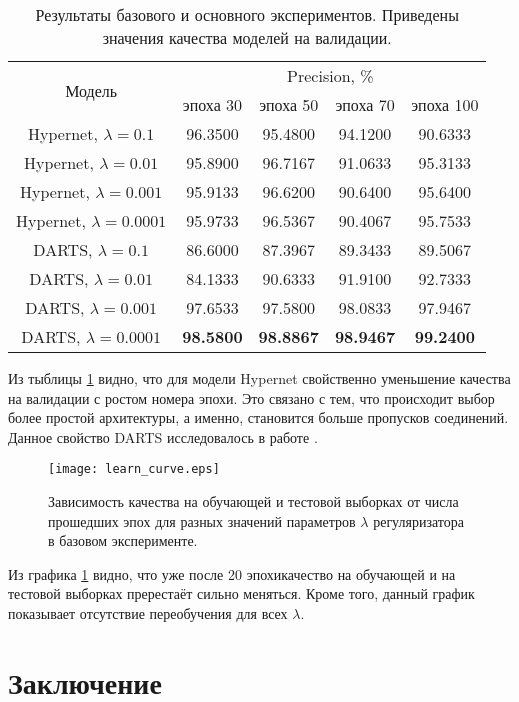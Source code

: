 \documentclass[12pt, twoside]{article}
\begin{document}
\begin{table}[H]
\centering
	\begin{tabular}{ |c|c|c|c|c| }
	\hline
	 \multirow{2}{*}{Модель} & \multicolumn{4}{c|}{Precision, \%} \\ \cline{2-5}
	 		& эпоха 30 & эпоха 50 & эпоха 70 & эпоха 100\\
	 \hline
 	Hypernet, $\lambda = 0.1$ &96.3500 & 95.4800 & 94.1200 & 90.6333  \\ 
 	Hypernet, $\lambda = 0.01$ &95.8900 & 96.7167& 91.0633 & 95.3133 \\ 
 	Hypernet, $\lambda = 0.001$ &95.9133 & 96.6200 & 90.6400 & 95.6400 \\ 
 	Hypernet, $\lambda = 0.0001$ &95.9733 & 96.5367 & 90.4067 & 95.7533\\
 	\hline
 	DARTS, $\lambda = 0.1$&86.6000 &87.3967 & 89.3433 & 89.5067 \\
 	DARTS, $\lambda = 0.01$& 84.1333 & 90.6333 &91.9100 & 92.7333\\
 	DARTS, $\lambda = 0.001$&97.6533 & 97.5800 & 98.0833 & 97.9467 \\
 	DARTS, $\lambda = 0.0001$& \textbf{98.5800} &  \textbf{98.8867}&\textbf{98.9467}&\textbf{99.2400} \\
 	\hline
\end{tabular}
\caption{\label{tab:exp} Результаты базового и основного экспериментов. Приведены значения качества моделей на валидации.}
\end{table}


Из тыблицы \ref{tab:exp} видно, что для модели Hypernet свойственно уменьшение качества на валидации с ростом номера эпохи. Это связано с тем, что происходит выбор более простой архитектуры, а именно, становится больше пропусков соединений. Данное свойство DARTS исследовалось в работе \cite{journals/corr/abs-1911-12126}.

\begin{figure}[H]
\centering
  \texttt{[image: learn\_curve.eps]}
  \caption{Зависимость качества на обучающей и тестовой выборках от числа прошедших эпох для разных значений параметров $\lambda$ регуляризатора в базовом эксперименте.}
  \label{fig:learn_curve}
\end{figure}
 Из графика \ref{fig:learn_curve} видно, что уже после 20 эпохикачество на обучающей и на тестовой выборках пререстаёт сильно меняться. Кроме того, данный график показывает отсутствие переобучения для всех $\lambda$.

\section{Заключение}
\end{document}
